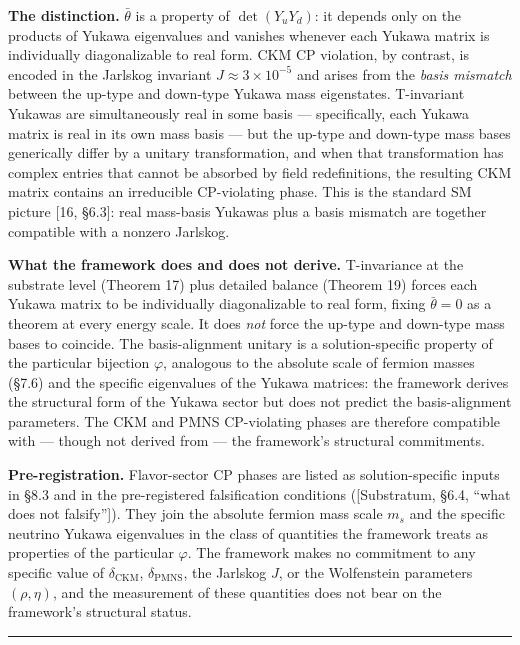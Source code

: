 \documentclass[
]{article}
\begin{document}
\textbf{The distinction.} \(\bar\theta\) is a property of
\(\det(Y_u Y_d)\): it depends only on the products of Yukawa eigenvalues
and vanishes whenever each Yukawa matrix is individually diagonalizable
to real form. CKM CP violation, by contrast, is encoded in the Jarlskog
invariant \(J \approx 3 \times 10^{-5}\) and arises from the \emph{basis
mismatch} between the up-type and down-type Yukawa mass eigenstates.
T-invariant Yukawas are simultaneously real in some basis ---
specifically, each Yukawa matrix is real in its own mass basis --- but
the up-type and down-type mass bases generically differ by a unitary
transformation, and when that transformation has complex entries that
cannot be absorbed by field redefinitions, the resulting CKM matrix
contains an irreducible CP-violating phase. This is the standard SM
picture {[}16, §6.3{]}: real mass-basis Yukawas plus a basis mismatch
are together compatible with a nonzero Jarlskog.

\textbf{What the framework does and does not derive.} T-invariance at
the substrate level (Theorem 17) plus detailed balance (Theorem 19)
forces each Yukawa matrix to be individually diagonalizable to real
form, fixing \(\bar\theta = 0\) as a theorem at every energy scale. It
does \emph{not} force the up-type and down-type mass bases to coincide.
The basis-alignment unitary is a solution-specific property of the
particular bijection \(\varphi\), analogous to the absolute scale of
fermion masses (§7.6) and the specific eigenvalues of the Yukawa
matrices: the framework derives the structural form of the Yukawa sector
but does not predict the basis-alignment parameters. The CKM and PMNS
CP-violating phases are therefore compatible with --- though not derived
from --- the framework's structural commitments.

\textbf{Pre-registration.} Flavor-sector CP phases are listed as
solution-specific inputs in §8.3 and in the pre-registered falsification
conditions ({[}Substratum, §6.4, ``what does not falsify''{]}). They
join the absolute fermion mass scale \(m_s\) and the specific neutrino
Yukawa eigenvalues in the class of quantities the framework treats as
properties of the particular \(\varphi\). The framework makes no
commitment to any specific value of \(\delta_{\text{CKM}}\),
\(\delta_{\text{PMNS}}\), the Jarlskog \(J\), or the Wolfenstein
parameters \((\rho, \eta)\), and the measurement of these quantities
does not bear on the framework's structural status.

\begin{center}\rule{0.5\linewidth}{0.5pt}\end{center}
\end{document}
